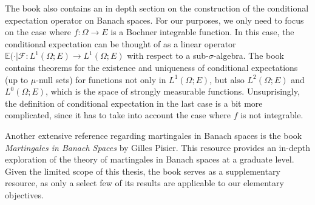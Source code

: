 The book also contains an in depth section on the construction of the conditional expectation operator on Banach spaces. For our purposes, we only need to focus on the case where $f : \Omega \rightarrow E$ is a Bochner integrable function. In this case, the conditional expectation can be thought of as a linear operator $\mathbb{E(\cdot\vert\mathcal{F}} : L^1(\Omega; E) \rightarrow L^1(\Omega; E)$ with respect to a sub-$\sigma$-algebra. The book contains theorems for the existence and uniqueness of conditional expectations (up to $\mu$-null sets) for functions not only in $L^1(\Omega; E)$, but also $L^2(\Omega; E)$ and $L^0(\Omega; E)$, which is the space of strongly measurable functions. Unsuprisingly, the definition of conditional expectation in the last case is a bit more complicated, since it has to take into account the case where $f$ is not integrable.

Another extensive reference regarding martingales in Banach spaces is the book \textit{Martingales in Banach Spaces} \cite{pisier_2016} by Gilles Pisier. This resource provides an in-depth exploration of the theory of martingales in Banach spaces at a graduate level. Given the limited scope of this thesis, the book serves as a supplementary resource, as only a select few of its results are applicable to our elementary objectives.
